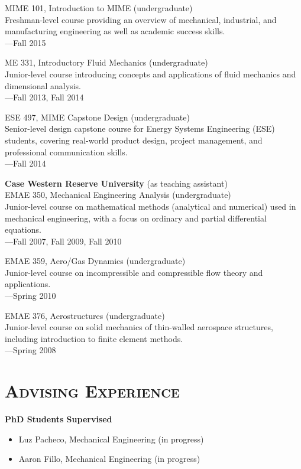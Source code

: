 \documentclass[margin,line,11pt]{res}
\begin{document}
\begin{resume}
MIME 101, Introduction to MIME (undergraduate) \\
Freshman-level course providing an overview of mechanical, industrial, and manufacturing engineering as well as academic success skills. \\
---Fall 2015

ME 331, Introductory Fluid Mechanics (undergraduate) \\
Junior-level course introducing concepts and applications of fluid mechanics and dimensional analysis. \\
---Fall 2013, Fall 2014

ESE 497, MIME Capstone Design (undergraduate) \\
Senior-level design capstone course for Energy Systems Engineering (ESE) students, covering real-world product design, project management, and professional communication skills. \\
---Fall 2014

\textbf{Case Western Reserve University} (as teaching assistant) \\
EMAE 350, Mechanical Engineering Analysis (undergraduate) \\
Junior-level course on mathematical methods (analytical and numerical) used in mechanical engineering, with a focus on ordinary and partial differential equations. \\
---Fall 2007, Fall 2009, Fall 2010

EMAE 359, Aero\slash Gas Dynamics (undergraduate) \\
Junior-level course on incompressible and compressible flow theory and applications. \\
---Spring 2010

EMAE 376, Aerostructures (undergraduate) \\
Junior-level course on solid mechanics of thin-walled aerospace structures, including introduction to finite element methods. \\
---Spring 2008

\section{\textsc{Advising Experience}}

\textbf{PhD Students Supervised}
\begin{itemize}[leftmargin=*]
\item Luz Pacheco, Mechanical Engineering (in progress)
\item Aaron Fillo, Mechanical Engineering (in progress)
\end{itemize}


\end{resume}
\end{document}
